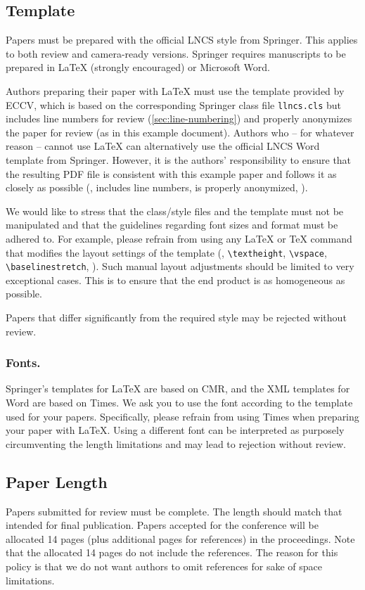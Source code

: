 \documentclass[runningheads]{eccv/llncs}
\begin{document}
\subsection{Template}
Papers must be prepared with the official LNCS style from Springer.
This applies to both review and camera-ready versions.
Springer requires manuscripts to be prepared in \LaTeX{} (strongly encouraged) or Microsoft Word. 

Authors preparing their paper with \LaTeX{} must use the template provided by ECCV, which is based on the corresponding Springer class file \texttt{llncs.cls} but includes line numbers for review (\cref{sec:line-numbering}) and properly anonymizes the paper for review (as in this example document).
Authors who -- for whatever reason -- cannot use \LaTeX{} can alternatively use the official LNCS Word template from Springer.
However, it is the authors' responsibility to ensure that the resulting PDF file is consistent with this example paper and follows it as closely as possible (\ie, includes line numbers, is properly anonymized, \etc).

We would like to stress that the class/style files and the template must not be manipulated and that the guidelines regarding font sizes and format must be adhered to. 
For example, please refrain from using any \LaTeX{} or \TeX{} command that modifies the layout settings of the template (\eg, \verb+\textheight+, \verb+\vspace+, \verb+\baselinestretch+, \etc).
Such manual layout adjustments should be limited to very exceptional cases.
This is to ensure that the end product is as homogeneous as possible.

Papers that differ significantly from the required style may be rejected without review.


\subsubsection{Fonts.}
Springer's templates for \LaTeX{} are based on CMR, and the XML templates for Word are based on Times. 
We ask you to use the font according to the template used for your papers. 
Specifically, please refrain from using Times when preparing your paper with \LaTeX{}.
Using a different font can be interpreted as purposely circumventing the length limitations and may lead to rejection without review.


\subsection{Paper Length}
Papers submitted for review must be complete. 
The length should match that intended for final publication. 
Papers accepted for the conference will be allocated 14 pages (plus additional pages for references) in the proceedings. 
Note that the allocated 14 pages do not include the references. 
The reason for this policy is that we do not want authors to omit references for sake of space limitations.
\end{document}
